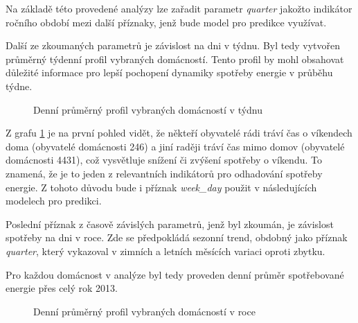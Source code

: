 \documentclass[FM,BP,fonts]{tulthesis}
\begin{document}
Na základě této provedené analýzy lze zařadit parametr \textit{quarter} jakožto indikátor ročního období mezi další příznaky, jenž bude model pro predikce využívat.

Další ze zkoumaných parametrů je závislost na dni v týdnu. Byl tedy vytvořen průměrný týdenní profil vybraných domácností. Tento profil by mohl obsahovat důležité informace pro lepší pochopení dynamiky spotřeby energie v průběhu týdne. 

\begin{figure}[htbp]
	\centering
	\caption{Denní průměrný profil vybraných domácností v týdnu}
	\label{fig:tyden_avg_group}
\end{figure}

Z grafu \ref{fig:tyden_avg_group} je na první pohled vidět, že někteří obyvatelé rádi tráví čas o víkendech doma (obyvatelé domácnosti 246) a jiní raději tráví čas mimo domov (obyvatelé domácnosti 4431), což vysvětluje snížení či zvýšení spotřeby o víkendu. To znamená, že je to jeden z relevantních indikátorů pro odhadování spotřeby energie. Z tohoto důvodu bude i příznak \textit{week\_day} použit v následujících modelech pro predikci.

Poslední příznak z časově závislých parametrů, jenž byl zkoumán, je závislost spotřeby na dni v roce. Zde se předpokládá sezonní trend, obdobný jako příznak \textit{quarter}, který vykazoval v zimních a letních měsících variaci oproti zbytku. 

Pro každou domácnost v analýze byl tedy proveden denní průměr spotřebované energie přes celý rok 2013. 

\begin{figure}[htbp]
	\centering
	\caption{Denní průměrný profil vybraných domácností v roce}
	\label{fig:year_avg_all}
\end{figure}
\end{document}
